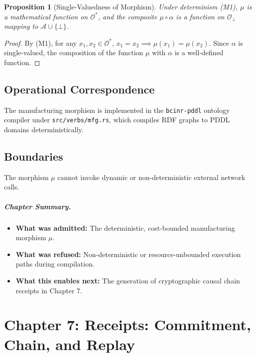 \documentclass[11pt,oneside]{book}
\theoremstyle{definition}
\theoremstyle{plain}
\newtheorem{proposition}[theorem]{Proposition}
\theoremstyle{remark}
\newcommand{\Obs}{\mathcal{O}}                 %
\newcommand{\Obsbot}{\Obs_{\bot}}             %
\newcommand{\Act}{\mathcal{A}}                 %
\newcommand{\muop}{\mu}                        %
\newcommand{\adm}{\alpha}                      %
\newcommand{\Rfsl}{\bot}                        %
\newcommand{\code}[1]{\texttt{#1}}
\begin{document}
\begin{proposition}[Single-Valuedness of Morphism]\label{prop:single_valued}
Under determinism (M1), $\muop$ is a mathematical function on $\Obs^*$, and the composite $\muop \circ \adm$ is a function on $\Obsbot$ mapping to $\Act \cup \{\Rfsl\}$. %
\end{proposition}

\begin{proof}
By (M1), for any $x_1, x_2 \in \Obs^*$, $x_1 = x_2 \implies \muop(x_1) = \muop(x_2)$. %
Since $\adm$ is single-valued, the composition of the function $\muop$ with $\adm$ is a well-defined function. %
\end{proof}

\section{Operational Correspondence}
The manufacturing morphism is implemented in the \code{bcinr-pddl} ontology compiler under \code{src/verbs/mfg.rs}, which compiles RDF graphs to PDDL domains deterministically. %

\section{Boundaries}
The morphism $\muop$ cannot invoke dynamic or non-deterministic external network calls. %

\paragraph{Chapter Summary.}
\begin{itemize}
  \item \textbf{What was admitted:} The deterministic, cost-bounded manufacturing morphism $\mu$. %
  \item \textbf{What was refused:} Non-deterministic or resource-unbounded execution paths during compilation. %
  \item \textbf{What this enables next:} The generation of cryptographic causal chain receipts in Chapter 7. %
\end{itemize}

\chapter{Chapter 7: Receipts: Commitment, Chain, and Replay}
\label{ch:receipts}
\end{document}
